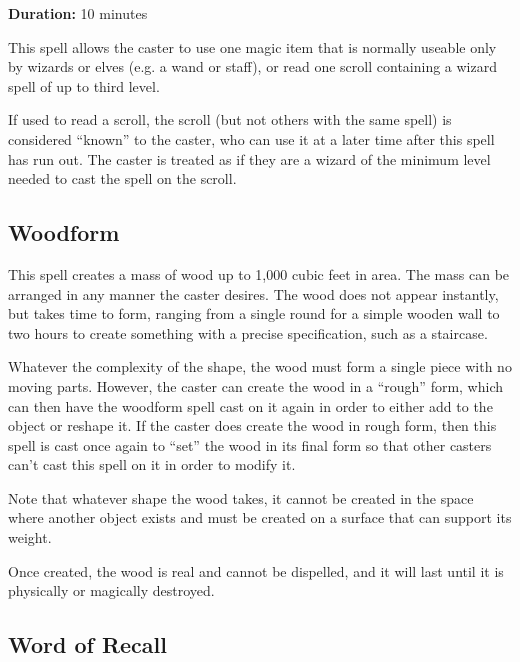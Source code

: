 \begin{multicols*}{2}
{\textbf{Duration:} 10 minutes}

This spell allows the caster to use one magic item that is normally useable only by wizards or elves (e.g. a wand or staff), or read one scroll containing a wizard spell of up to third level.

If used to read a scroll, the scroll (but not others with the same spell) is considered “known” to the caster, who can use it at a later time after this spell has run out. The caster is treated as if they are a wizard of the minimum level needed to cast the spell on the scroll.

\subsection{Woodform}\label{spell:Woodform}

This spell creates a mass of wood up to 1,000 cubic feet in area. The mass can be arranged in any manner the caster desires. The wood does not appear instantly, but takes time to form, ranging from a single round for a simple wooden wall to two hours to create something with a precise specification, such as a staircase.

Whatever the complexity of the shape, the wood must form a single piece with no moving parts. However, the caster can create the wood in a “rough” form, which can then have the woodform spell cast on it again in order to either add to the object or reshape it. If the caster does create the wood in rough form, then this spell is cast once again to “set” the wood in its final form so that other casters can’t cast this spell on it in order to modify it.

Note that whatever shape the wood takes, it cannot be created in the space where another object exists and must be created on a surface that can support its weight.

Once created, the wood is real and cannot be dispelled, and it will last until it is physically or magically destroyed.

\subsection{Word of Recall}\label{spell:Word of Recall}
\end{multicols*}
